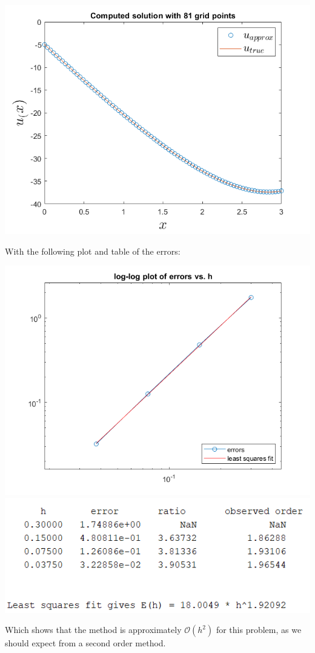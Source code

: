 \documentclass{article}
\begin{document}
\begin{center}
    \includegraphics[scale = 0.4]{bvp2Mod_81.png}
    \newline\newline
\end{center}
With the following plot and table of the errors:
\begin{center}
    \includegraphics[scale = 0.4]{bvp2Mod_err.png}
    \includegraphics[scale = 0.7]{bvp2Mod_errTab.PNG}
    \newline\newline
\end{center}
Which shows that the method is approximately $\mathcal{O}(h^2)$ for this problem, as we should expect from a second order method.
\end{document}
